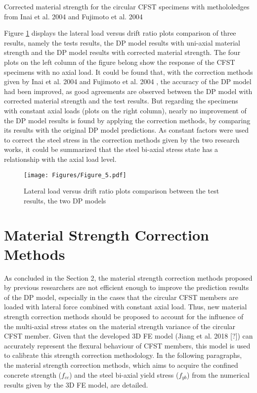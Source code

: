 \documentclass[12pt,a4]{article}
\begin{document}
	\par
	\begin{table}[h]
		\centering
		\caption{Corrected material strength for the circular CFST specimens with methololedges from Inai et al. 2004 \cite{RN30} and Fujimoto et al. 2004 \cite{RN15}}
		
		\label{tb-1}
	\end{table}
	\par
	Figure \ref{fig-4} displays the lateral load versus drift ratio plots comparison of three results, namely the tests results, the DP model results with uni-axial material strength and the DP model results with corrected material strength. The four plots on the left column of the figure belong show the response of the CFST specimens with no axial load. It could be found that, with the correction methods given by Inai et al. 2004 \cite{RN30} and Fujimoto et al. 2004 \cite{RN15}, the accuracy of the DP model had been improved, as good agreements are observed between the DP model with corrected material strength and the test results. But regarding the specimens with constant axial loads (plots on the right column), nearly no improvement of the DP model results is found by applying the correction methods, by comparing its results with the original DP model predictions. As constant factors were used to correct the steel stress in the correction methods given by the two research works, it could be summarized that the steel bi-axial stress state has a relationship with the axial load level.
	\par
	\begin{figure}[h]
		\centering
		\texttt{[image: Figures/Figure\_5.pdf]}
		\caption{Lateral load versus drift ratio plots comparison between the test results, the two DP models}
		\label{fig-4}
	\end{figure}
	\par
	\section{Material Strength Correction Methods}
	As concluded in the Section 2, the material strength correction methods proposed by previous researchers are not efficient enough to improve the prediction results of the DP model, especially in the cases that the circular CFST members are loaded with lateral force combined with constant axial load. Thus, new material strength correction methods should be proposed to account for the influence of the multi-axial stress states on the material strength variance of the circular CFST member. Given that the developed 3D FE model (Jiang et al. 2018 [?]) can accurately represent the flexural behaviour of CFST members, this model is used to calibrate this strength correction methodology. In the following paragraphs, the material strength correction methods, which aims to acquire the confined concrete strength ($f_{cc}$) and the steel bi-axial yield stress ($f_{yb}$) from the numerical results given by the 3D FE model, are detailed.
	\par
	
\end{document}
